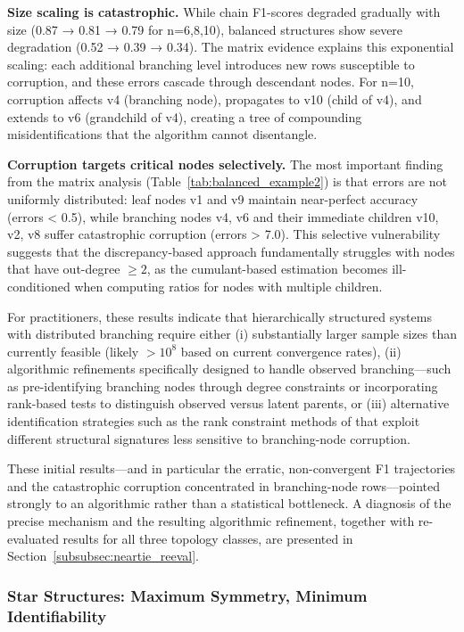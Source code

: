 \documentclass[11pt,a4paper]{article}
\numberwithin{equation}{section}
\begin{document}
\textbf{Size scaling is catastrophic.} While chain F1-scores degraded gradually with size (0.87 → 0.81 → 0.79 for n=6,8,10), balanced structures show severe degradation (0.52 → 0.39 → 0.34). The matrix evidence explains this exponential scaling: each additional branching level introduces new rows susceptible to corruption, and these errors cascade through descendant nodes. For n=10, corruption affects v4 (branching node), propagates to v10 (child of v4), and extends to v6 (grandchild of v4), creating a tree of compounding misidentifications that the algorithm cannot disentangle.

\textbf{Corruption targets critical nodes selectively.} The most important finding from the matrix analysis (Table~\ref{tab:balanced_example2}) is that errors are not uniformly distributed: leaf nodes v1 and v9 maintain near-perfect accuracy (errors < 0.5), while branching nodes v4, v6 and their immediate children v10, v2, v8 suffer catastrophic corruption (errors > 7.0). This selective vulnerability suggests that the discrepancy-based approach fundamentally struggles with nodes that have out-degree $\geq 2$, as the cumulant-based estimation becomes ill-conditioned when computing ratios for nodes with multiple children.

For practitioners, these results indicate that hierarchically structured systems with distributed branching require either (i) substantially larger sample sizes than currently feasible (likely $>10^8$ based on current convergence rates), (ii) algorithmic refinements specifically designed to handle observed branching—such as pre-identifying branching nodes through degree constraints or incorporating rank-based tests to distinguish observed versus latent parents, or (iii) alternative identification strategies such as the rank constraint methods of \citet{cai:etal:2024:rank} that exploit different structural signatures less sensitive to branching-node corruption.

These initial results---and in particular the erratic, non-convergent F1 trajectories and the catastrophic corruption concentrated in branching-node rows---pointed strongly to an algorithmic rather than a statistical bottleneck.  A diagnosis of the precise mechanism and the resulting algorithmic refinement, together with re-evaluated results for all three topology classes, are presented in Section~\ref{subsubsec:neartie_reeval}.

\subsubsection{Star Structures: Maximum Symmetry, Minimum Identifiability}
\end{document}
